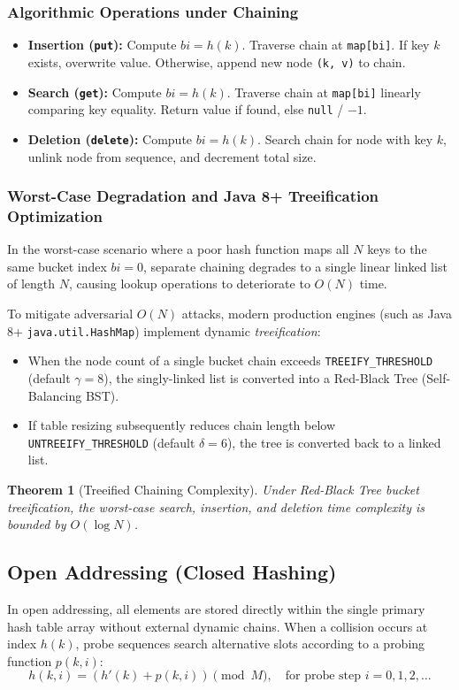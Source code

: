 \documentclass[10pt,journal,compsoc,onecolumn]{IEEEtran}
\newtheorem{theorem}{Theorem}
\begin{document}
\subsubsection{Algorithmic Operations under Chaining}
\begin{itemize}
    \item \textbf{Insertion (\texttt{put}):} Compute $bi = h(k)$. Traverse chain at \texttt{map[bi]}. If key $k$ exists, overwrite value. Otherwise, append new node \texttt{(k, v)} to chain.
    \item \textbf{Search (\texttt{get}):} Compute $bi = h(k)$. Traverse chain at \texttt{map[bi]} linearly comparing key equality. Return value if found, else \texttt{null} / $-1$.
    \item \textbf{Deletion (\texttt{delete}):} Compute $bi = h(k)$. Search chain for node with key $k$, unlink node from sequence, and decrement total size.
\end{itemize}

\subsubsection{Worst-Case Degradation and Java 8+ Treeification Optimization}
In the worst-case scenario where a poor hash function maps all $N$ keys to the same bucket index $bi = 0$, separate chaining degrades to a single linear linked list of length $N$, causing lookup operations to deteriorate to $O(N)$ time.

To mitigate adversarial $O(N)$ attacks, modern production engines (such as Java 8+ \texttt{java.util.HashMap}) implement dynamic \emph{treeification}:
\begin{itemize}
    \item When the node count of a single bucket chain exceeds \texttt{TREEIFY\_THRESHOLD} (default $\gamma = 8$), the singly-linked list is converted into a Red-Black Tree (Self-Balancing BST).
    \item If table resizing subsequently reduces chain length below \texttt{UNTREEIFY\_THRESHOLD} (default $\delta = 6$), the tree is converted back to a linked list.
\end{itemize}

\begin{theorem}[Treeified Chaining Complexity]
Under Red-Black Tree bucket treeification, the worst-case search, insertion, and deletion time complexity is bounded by $O(\log N)$.
\end{theorem}

\subsection{Open Addressing (Closed Hashing)}
In open addressing, all elements are stored directly within the single primary hash table array without external dynamic chains. When a collision occurs at index $h(k)$, probe sequences search alternative slots according to a probing function $p(k, i)$:
\[
h(k, i) = (h'(k) + p(k, i)) \pmod M, \quad \text{for probe step } i = 0, 1, 2, \dots
\]
\end{document}
